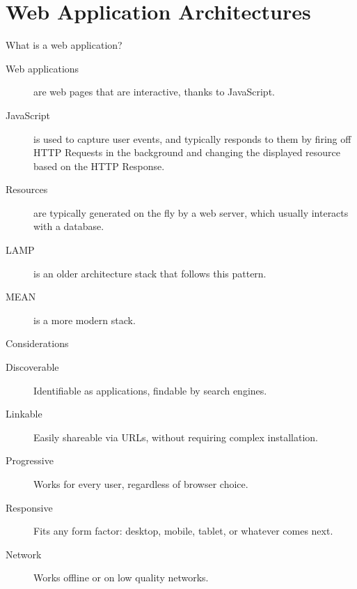 
\section{Web Application Architectures}

\begin{frame}{What is a web application?}
  \begin{description}
    \item[Web applications] are web pages that are interactive, thanks to JavaScript.
    \item[JavaScript] is used to capture user events, and typically responds to them by firing off HTTP Requests in the background and changing the displayed resource based on the HTTP Response.
    \item[Resources] are typically generated on the fly by a web server, which usually interacts with a database.
    \item[LAMP] is an older architecture stack that follows this pattern.
    \item[MEAN] is a more modern stack.
  \end{description}
\end{frame}

\begin{frame}{Considerations}
  \begin{description}
    \item[Discoverable] Identifiable as applications, findable by search engines.
    \item[Linkable] Easily shareable via URLs, without requiring complex installation.
    \item[Progressive] Works for every user, regardless of browser choice.
    \item[Responsive] Fits any form factor: desktop, mobile, tablet, or whatever comes next.
    \item[Network] Works offline or on low quality networks.
  \end{description}
\end{frame}